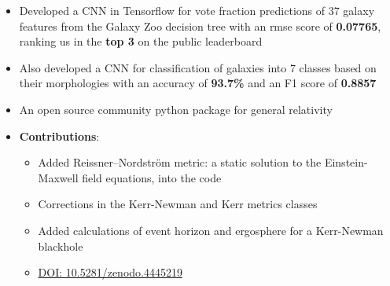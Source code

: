 \documentclass[10pt,a4paper,ragged2e,withhyper]{altacv}
\begin{document}
\begin{paracol}{2}
    \begin{itemize}
        \item Developed a CNN in Tensorflow for vote fraction predictions of 37 galaxy features from the Galaxy Zoo decision tree with an rmse score of \textbf{0.07765}, ranking us in the \textbf{top 3} on the public leaderboard
        \item Also developed a CNN for classification of galaxies into 7 classes based on their morphologies with an accuracy of \textbf{93.7\%} and an F1 score of \textbf{0.8857}
    \end{itemize}
\begin{comment}
\cvsubsection{THE SCHRODPY PROJECT}
    \begin{itemize}
        \item The project is in early phases, which plans at providing an efficient simulation of quantum systems
        \item Applied various methods to numerically solve Schrödinger's Time Independent wave equation for finding stationary states of the particle in an Infinite Potential Well
        \item Prospects: An efficient and community python package for simulating quantum many-body systems using tensor networks
    \end{itemize}
\end{comment}
\begin{itemize}
    \item An open source community python package for general relativity
    \item \textbf{Contributions}:
    \begin{itemize}
        \item Added Reissner–Nordström metric: a static solution to the Einstein-Maxwell field equations, into the code %
        \item Corrections in the Kerr-Newman and Kerr metrics classes
        \item Added calculations of event horizon and ergosphere for a Kerr-Newman blackhole %
        \item \href{https://doi.org/10.5281/zenodo.4445219}{DOI: 10.5281/zenodo.4445219}
    \end{itemize}
\end{itemize}
\nocite{*}
\printbibliography[heading=pubtype,title={\printinfo{\faFile*[regular]}{Journal Articles}}, type=misc]


\end{paracol}
\end{document}
